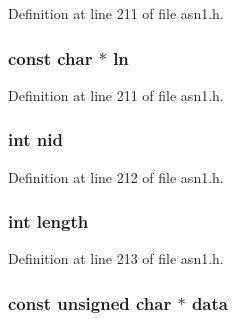 Definition at line 211 of file asn1.\+h.

\subsubsection[{\texorpdfstring{ln}{ln}}]{\setlength{\rightskip}{0pt plus 5cm}const char $\ast$ ln}\hypertarget{structasn1__object__st_ac3d72435ebf187f1efd1359b6d795146}{}\label{structasn1__object__st_ac3d72435ebf187f1efd1359b6d795146}


Definition at line 211 of file asn1.\+h.

\subsubsection[{\texorpdfstring{nid}{nid}}]{\setlength{\rightskip}{0pt plus 5cm}int nid}\hypertarget{structasn1__object__st_a7235ef62e89328f5155846dc59c6fc37}{}\label{structasn1__object__st_a7235ef62e89328f5155846dc59c6fc37}


Definition at line 212 of file asn1.\+h.

\subsubsection[{\texorpdfstring{length}{length}}]{\setlength{\rightskip}{0pt plus 5cm}int length}\hypertarget{structasn1__object__st_a9f59b34b1f25fe00023291b678246bcc}{}\label{structasn1__object__st_a9f59b34b1f25fe00023291b678246bcc}


Definition at line 213 of file asn1.\+h.

\subsubsection[{\texorpdfstring{data}{data}}]{\setlength{\rightskip}{0pt plus 5cm}const unsigned char $\ast$ data}\hypertarget{structasn1__object__st_af156252eef84b50be6ae26b0b9ad3dae}{}\label{structasn1__object__st_af156252eef84b50be6ae26b0b9ad3dae}


